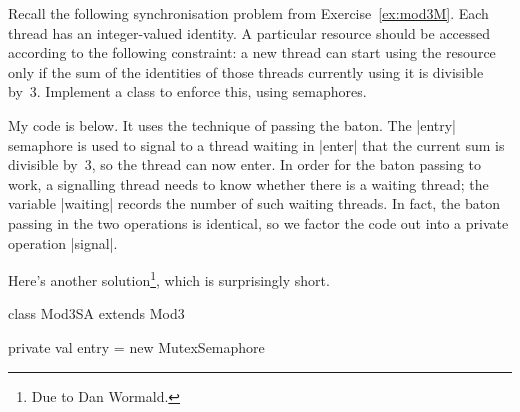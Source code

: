 \begin{question}
Recall the following synchronisation problem from Exercise~\ref{ex:mod3M}.
Each thread has an integer-valued identity.  A particular resource should be
accessed according to the following constraint: a new thread can start using
the resource only if the sum of the identities of those threads currently
using it is divisible by~3.  Implement a class to enforce this, using
semaphores.
\end{question}


\begin{answerI}
My code is below.  It uses the technique of passing the baton.  The |entry|
semaphore is used to signal to a thread waiting in |enter| that the current
sum is divisible by~3, so the thread can now enter.  In order for the baton
passing to work, a signalling thread needs to know whether there is a waiting
thread; the variable |waiting| records the number of such waiting threads.  In
fact, the baton passing in the two operations is identical, so we factor the
code out into a private operation |signal|.
%

Here's another solution\footnote{Due to Dan Wormald.}, which is surprisingly
short.
%
\begin{scala}
class Mod3SA extends Mod3{
  private val entry = new MutexSemaphore

}
\end{scala}
\end{answerI}
